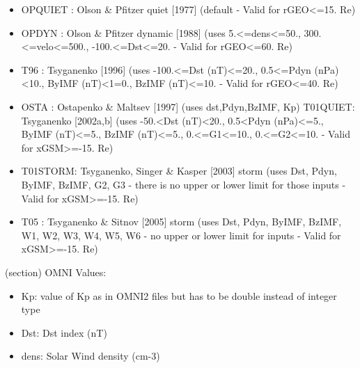 \begin{boxedminipage}{\funcwidth}
\begin{itemize}
        \item OPQUIET : Olson \& Pfitzer quiet [1977] (default - Valid for 
          rGEO{\textless}=15. Re)

        \item OPDYN   : Olson \& Pfitzer dynamic [1988] (uses 
          5.{\textless}=dens{\textless}=50., 
          300.{\textless}=velo{\textless}=500., 
          -100.{\textless}=Dst{\textless}=20. - Valid for 
          rGEO{\textless}=60. Re)

        \item T96    : Tsyganenko [1996] (uses -100.{\textless}=Dst 
          (nT){\textless}=20., 0.5{\textless}=Pdyn (nPa){\textless}10., 
          {\textbar}ByIMF{\textbar} (nT){\textless}1=0., 
          {\textbar}BzIMF{\textbar} (nT){\textless}=10. - Valid for 
          rGEO{\textless}=40. Re)

        \item OSTA  : Ostapenko \& Maltsev [1997] (uses dst,Pdyn,BzIMF, Kp) 
          T01QUIET: Tsyganenko [2002a,b] (uses -50.{\textless}Dst 
          (nT){\textless}20., 0.5{\textless}Pdyn (nPa){\textless}=5., 
          {\textbar}ByIMF{\textbar} (nT){\textless}=5., 
          {\textbar}BzIMF{\textbar} (nT){\textless}=5., 
          0.{\textless}=G1{\textless}=10., 0.{\textless}=G2{\textless}=10. 
          - Valid for xGSM{\textgreater}=-15. Re)

        \item T01STORM: Tsyganenko, Singer \& Kasper [2003] storm  (uses Dst, 
          Pdyn, ByIMF, BzIMF, G2, G3 - there is no upper or lower limit for
          those inputs - Valid for xGSM{\textgreater}=-15. Re)

        \item T05    : Tsyganenko \& Sitnov [2005] storm  (uses Dst, Pdyn, 
          ByIMF, BzIMF, W1, W2, W3, W4, W5, W6 - no upper or lower limit 
          for inputs - Valid for xGSM{\textgreater}=-15. Re)

      \end{itemize}

    (section) OMNI Values:

      \begin{itemize}
      \setlength{\parskip}{0.6ex}
        \item Kp: value of Kp as in OMNI2 files but has to be double instead of
          integer type

        \item Dst: Dst index (nT)

        \item dens: Solar Wind density (cm-3)


\end{itemize}
\end{boxedminipage}
